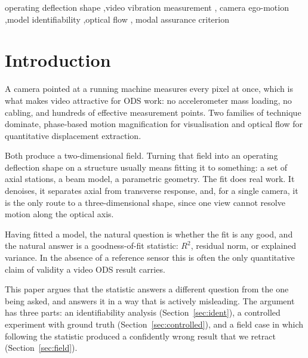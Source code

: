 \documentclass[preprint,12pt]{elsarticle}
\begin{document}
\begin{frontmatter}
\begin{keyword}
operating deflection shape \sep video vibration measurement \sep
camera ego-motion \sep model identifiability \sep optical flow \sep
modal assurance criterion
\end{keyword}

\end{frontmatter}

\section{Introduction}
\label{sec:intro}

A camera pointed at a running machine measures every pixel at once, which is
what makes video attractive for ODS work: no accelerometer mass loading, no
cabling, and hundreds of effective measurement points. Two families of
technique dominate, phase-based motion magnification for visualisation and
optical flow for quantitative displacement extraction.

Both produce a two-dimensional field. Turning that field into an operating
deflection shape on a structure usually means fitting it to something: a set
of axial stations, a beam model, a parametric geometry. The fit does real
work. It denoises, it separates axial from transverse response, and, for a
single camera, it is the only route to a three-dimensional shape, since one
view cannot resolve motion along the optical axis.

Having fitted a model, the natural question is whether the fit is any good,
and the natural answer is a goodness-of-fit statistic: $R^2$, residual norm,
or explained variance. In the absence of a reference sensor this is often
the only quantitative claim of validity a video ODS result carries.

This paper argues that the statistic answers a different question from the
one being asked, and answers it in a way that is actively misleading. The
argument has three parts: an identifiability analysis
(Section~\ref{sec:ident}), a controlled experiment with ground truth
(Section~\ref{sec:controlled}), and a field case in which following the
statistic produced a confidently wrong result that we retract
(Section~\ref{sec:field}).
\end{document}
